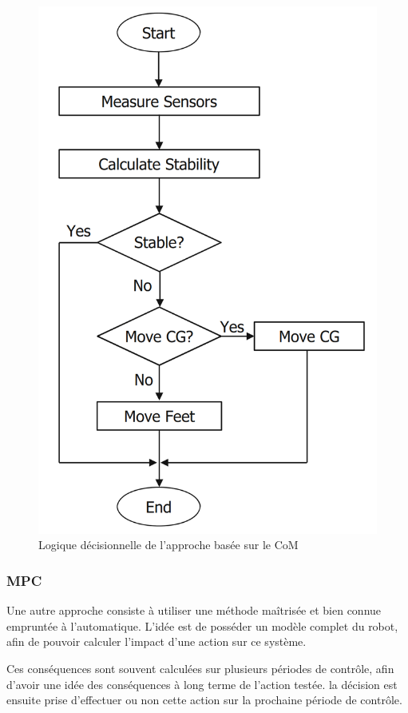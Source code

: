 \documentclass{tnreport}
\begin{document}
\begin{figure}
    \centering
    \includegraphics[scale=0.6]{figures/com}
    \caption{Logique décisionnelle de l'approche basée sur le \gls{CoM}}
    \label{fig:comdec}
\end{figure}

\subsubsection{\gls{MPC}}
Une autre approche consiste à utiliser une méthode maîtrisée et bien connue empruntée à l'automatique. L'idée est de posséder un modèle complet du robot, afin de pouvoir calculer l'impact d'une action sur ce système. 

Ces conséquences sont souvent calculées sur plusieurs périodes de contrôle, afin d'avoir une idée des conséquences à long terme de l'action testée. la décision est ensuite prise d'effectuer ou non cette action sur la prochaine période de contrôle. 
\end{document}
